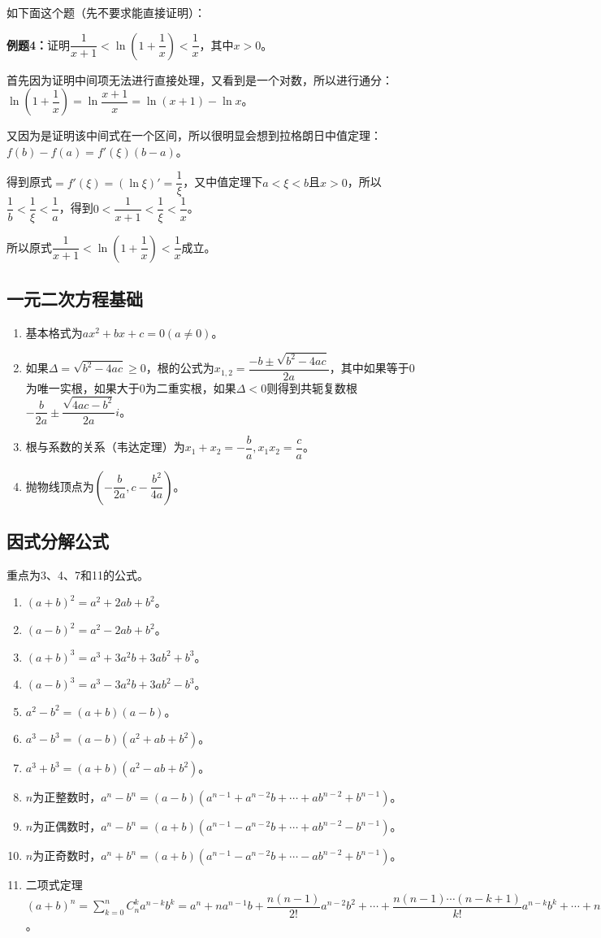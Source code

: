 \documentclass[UTF8, 12pt]{ctexart}
\begin{document}
如下面这个题（先不要求能直接证明）：

\textbf{例题4：}证明$\dfrac{1}{x+1}<\ln(1+\dfrac{1}{x})<\dfrac{1}{x}$，其中$x>0$。

首先因为证明中间项无法进行直接处理，又看到是一个对数，所以进行通分：$\ln(1+\dfrac{1}{x})=\ln\dfrac{x+1}{x}=\ln(x+1)-\ln x$。

又因为是证明该中间式在一个区间，所以很明显会想到拉格朗日中值定理：$f(b)-f(a)=f'(\xi)(b-a)$。

得到原式$=f'(\xi)=(\ln\xi)'=\dfrac{1}{\xi}$，又中值定理下$a<\xi<b$且$x>0$，所以$\dfrac{1}{b}<\dfrac{1}{\xi}<\dfrac{1}{a}$，得到$0<\dfrac{1}{x+1}<\dfrac{1}{\xi}<\dfrac{1}{x}$。

所以原式$\dfrac{1}{x+1}<\ln(1+\dfrac{1}{x})<\dfrac{1}{x}$成立。

\subsection{一元二次方程基础}

\begin{enumerate}
    \item 基本格式为$ax^2+bx+c=0(a\neq 0)$。
    \item 如果$\Delta=\sqrt{b^2-4ac}\geqslant 0$，根的公式为$x_{1,2}=\dfrac{-b\pm\sqrt{b^2-4ac}}{2a}$，其中如果等于0为唯一实根，如果大于0为二重实根，如果$\Delta<0$则得到共轭复数根$-\dfrac{b}{2a}\pm\dfrac{\sqrt{4ac-b^2}}{2a}i$。
    \item 根与系数的关系（韦达定理）为$x_1+x_2=-\dfrac{b}{a},x_1x_2=\dfrac{c}{a}$。
    \item 抛物线顶点为$(-\dfrac{b}{2a},c-\dfrac{b^2}{4a})$。
\end{enumerate}

\subsection{因式分解公式}

重点为3、4、7和11的公式。

\begin{enumerate}
    \item $(a+b)^2=a^2+2ab+b^2$。
    \item $(a-b)^2=a^2-2ab+b^2$。
    \item $(a+b)^3=a^3+3a^2b+3ab^2+b^3$。
    \item $(a-b)^3=a^3-3a^2b+3ab^2-b^3$。
    \item $a^2-b^2=(a+b)(a-b)$。
    \item $a^3-b^3=(a-b)(a^2+ab+b^2)$。
    \item $a^3+b^3=(a+b)(a^2-ab+b^2)$。
    \item $n$为正整数时，$a^n-b^n=(a-b)(a^{n-1}+a^{n-2}b+\cdots+ab^{n-2}+b^{n-1})$。
    \item $n$为正偶数时，$a^n-b^n=(a+b)(a^{n-1}-a^{n-2}b+\cdots+ab^{n-2}-b^{n-1})$。
    \item $n$为正奇数时，$a^n+b^n=(a+b)(a^{n-1}-a^{n-2}b+\cdots-ab^{n-2}+b^{n-1})$。
    \item 二项式定理$(a+b)^n=\sum_{k=0}^nC_n^ka^{n-k}b^k=a^n+na^{n-1}b+\dfrac{n(n-1)}{2!}a^{n-2}b^2+\cdots+\dfrac{n(n-1)\cdots(n-k+1)}{k!}a^{n-k}b^k+\cdots+nab^{n-1}+b^n$。
\end{enumerate}
\end{document}
